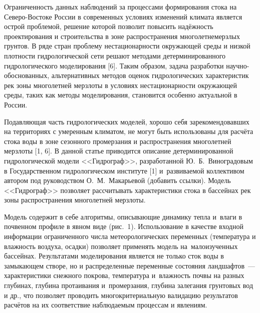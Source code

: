  

\makeProcTitle
{}

Ограниченность данных наблюдений за процессами формирования стока на Северо-Востоке России в современных условиях изменений климата является острой проблемой, решение которой позволит повысить надёжность проектирования и строительства в зоне распространения многолетнемерзлых грунтов. В ряде стран проблему нестационарности окружающей среды и низкой плотности гидрологической сети решают методами детерминированного гидрологического моделирования [6]. Таким образом, задача разработки научно-обоснованных, альтернативных методов оценок гидрологических характеристик рек зоны многолетней мерзлоты в условиях нестационарности окружающей среды, таких как методы моделирования, становится особенно актуальной в России.

Подавляющая часть гидрологических моделей, хорошо себя зарекомендовавших на территориях с умеренным климатом, не могут быть использованы для расчёта стока воды в зоне сезонного промерзания и распространения многолетней мерзлоты [1, 6]. В данной статье приводится описание детерминированной гидрологической модели <<Гидрограф>>, разработанной Ю.~Б.~Виноградовым в Государственном гидрологическом институте [1] и~развиваемой коллективом автором под руководством О.~М.~Макарьевой (добавить ссылки). Модель <<Гидрограф>> позволяет рассчитывать характеристики стока в бассейнах рек зоны распространения многолетней мерзлоты.

Модель содержит в себе алгоритмы, описывающие динамику тепла и~влаги в почвенном профиле в явном виде (рис.~1). Использование в качестве входной информации ограниченного числа метеорологических переменных (температура и влажность воздуха, осадки) позволяет применять модель на~малоизученных бассейнах. Результатами моделирования является не только сток воды в замыкающем створе, но и распределенные переменные состояния ландшафтов~--- характеристики снежного покрова, температура и~влажность почвы на разных глубинах, глубина протаивания и~промерзания, глубина залегания грунтовых вод и др., что позволяет проводить многокритериальную валидацию результатов расчётов на их соответствие наблюдаемым процессам и явлениям.

